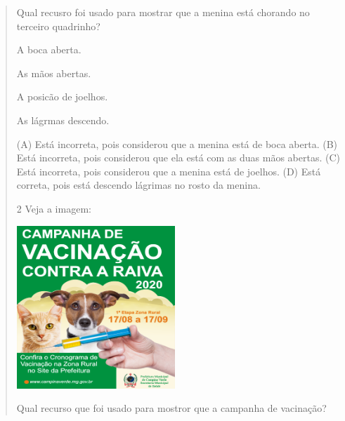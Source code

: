 \begin{verse}

Qual recusro foi usado para mostrar que a menina está chorando no
terceiro quadrinho?

\begin{minipage}{.5\textwidth}
\begin{escolha}
\item A boca aberta.

\item As mãos abertas.

\item A posicão de joelhos.

\item As lágrmas descendo.
\end{escolha}
\end{minipage}

(A) Está incorreta, pois considerou que a menina está de boca aberta.
(B) Está incorreta, pois considerou que ela está com as duas mãos abertas.
(C) Está incorreta, pois considerou que a menina está de joelhos.
(D) Está correta, pois está descendo lágrimas no rosto da menina.

\num{2} Veja a imagem:

\includegraphics[width=2.34507in,height=2.41801in]{media/image137.png}


Qual recurso que foi usado para mostror que a campanha de vacinação?


\end{verse}
